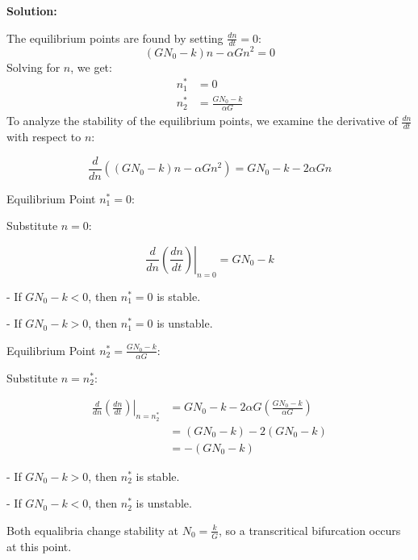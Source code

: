\documentclass[12pt]{article}
\newenvironment{solution}{
    \textbf{Solution:}
    
}{
    
    \vspace{2em}
}
\begin{document}
\begin{solution}
    The equilibrium points are found by setting \(\frac{dn}{dt} = 0\):
    \[
        (GN_0 - k)n - \alpha G n^2 = 0
    \]
    Solving for \(n\), we get:
    \[
        \begin{aligned}
            n^*_1 &= 0 \\
            n_2^* &= \frac{GN_0 - k}{\alpha G}
        \end{aligned}
    \]
    To analyze the stability of the equilibrium points, we examine the derivative of \(\frac{dn}{dt}\) with respect to \(n\):

    \[
        \frac{d}{dn}\left( (G N_0 - k)n - \alpha G n^2 \right) = G N_0 - k - 2 \alpha G n
    \]

    Equilibrium Point \(n_1^* = 0\):

    Substitute \(n = 0\):

    \[  
        \left.\frac{d}{dn}\left( \frac{dn}{dt} \right)\right|_{n=0} = G N_0 - k
    \]

    - If \(G N_0 - k < 0\), then \(n_1^* = 0\) is stable.

    - If \(G N_0 - k > 0\), then \(n_1^* = 0\) is unstable.

    Equilibrium Point \(n_2^* = \frac{G N_0 - k}{\alpha G}\):

    Substitute \(n = n_2^*\):

    \[
        \begin{aligned}
            \left.\frac{d}{dn}\left( \frac{dn}{dt} \right)\right|_{n=n_2^*} &= G N_0 - k - 2 \alpha G \left( \frac{G N_0 - k}{\alpha G} \right) \\
            &= (G N_0 - k) - 2 (G N_0 - k) \\
            &= -(G N_0 - k)
        \end{aligned}
    \]

    - If \(G N_0 - k > 0\), then \(n_2^*\) is stable.

    - If \(G N_0 - k < 0\), then \(n_2^*\) is unstable.

    Both equalibria change stability at \(N_0 = \frac{k}{G}\), so a transcritical bifurcation occurs at this point.
    
\end{solution}

    
\end{document}
